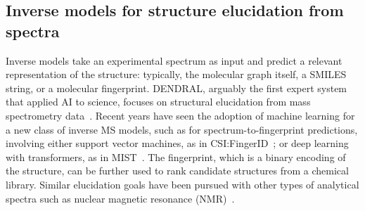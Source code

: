 \subsection{Inverse models for structure elucidation from spectra}

Inverse models take an experimental spectrum as input and predict a relevant representation of the structure: typically, the molecular graph itself, a SMILES string, or a molecular fingerprint. 
DENDRAL, arguably the first expert system that applied AI to science, focuses on structural elucidation from mass spectrometry data~\citep{lindsay1980dendral}. 
Recent years have seen the adoption of machine learning for a new class of inverse MS models, such as for spectrum-to-fingerprint predictions, involving either support vector machines, as in CSI:FingerID~\citep{duhrkop2015csifingerid}; or deep learning with transformers, as in MIST~\citep{goldman2023mist}. The fingerprint, which is a binary encoding of the structure, can be further used to rank candidate structures from a chemical library. Similar elucidation goals have been pursued with other types of analytical spectra such as nuclear magnetic resonance (NMR)~\citep{alberts2023learning}. 

